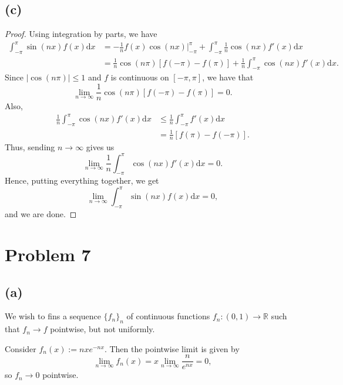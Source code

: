 \documentclass{article}
\newcommand{\R}{\mathbb{R}} %
\begin{document}
\subsection*{(c)}
\begin{proof}
	Using integration by parts, we have
	\begin{align}
		\int_{-\pi}^\pi \sin(nx) f(x) \mathrm{d}x &= -\frac{1}{n}f(x) \cos(nx)\big|_{-\pi}^\pi + \int_{-\pi}^\pi \frac{1}{n}\cos(nx)f'(x) \mathrm{d}x \\
		&= \frac{1}{n}\cos(n\pi)\left[f(-\pi) - f(\pi)\right] + \frac{1}{n} \int_{-\pi}^\pi \cos(nx)f'(x)\mathrm{d}x.
	\end{align}
	Since $|\cos(n\pi)| \leq 1$ and $f$ is continuous on $[-\pi, \pi]$, we have that 
	\begin{equation}
		\lim\limits_{n \to \infty} \frac{1}{n} \cos(n\pi) \left[f(-\pi) - f(\pi)\right] = 0.
	\end{equation}
	Also,
	\begin{align}
		\frac{1}{n}\int_{-\pi}^\pi \cos(nx) f'(x) \mathrm{d}x &\leq \frac{1}{n} \int_{-\pi}^\pi f'(x) \mathrm{d}x \\
		&= \frac{1}{n}\left[f(\pi) - f(-\pi)\right].
	\end{align}
	Thus, sending $n \to \infty$ gives us
	\begin{equation}
		\lim\limits_{n \to \infty} \frac{1}{n} \int_{-\pi}^\pi \cos(nx) f'(x) \mathrm{d}x = 0.
	\end{equation}
	Hence, putting everything together, we get
	\begin{equation}
		\lim\limits_{n \to \infty} \int_{-\pi}^\pi \sin(nx) f(x) \mathrm{d}x = 0,
	\end{equation}
	and we are done.
\end{proof}
\section*{Problem 7}
\subsection*{(a)}
We wish to fins a sequence $\{f_n\}_n$ of continuous functions $f_n: (0, 1) \to \R$ such that $f_n \to f$ pointwise, but not uniformly.

Consider $f_n(x) := nx e^{-nx}$. Then the pointwise limit is given by 
\begin{equation}
	\lim\limits_{n \to \infty} f_n(x) = x \lim\limits_{n \to \infty} \frac{n}{e^{nx}} = 0,
\end{equation}
so $f_n \to 0$ pointwise.
\end{document}
